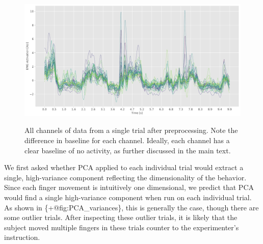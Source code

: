 \begin{figure}
\label{fig:preprocessed_data}
\centering
\includegraphics[width=1\textwidth,height=\textheight]{images/data_analysis/fingers/preprocessed_data.pdf}
\caption{All channels of data from a single trial after preprocessing.
Note the difference in baseline for each channel. Ideally, each channel
has a clear baseline of no activity, as further discussed in the main
text.}\label{fig:preprocessed_data}
\end{figure}

We first asked whether PCA applied to each individual trial would
extract a single, high-variance component reflecting the dimensionality
of the behavior. Since each finger movement is intuitively one
dimensional, we predict that PCA would find a single high-variance
component when run on each individual trial. As shown in
\{+@fig:PCA\_variances\}, this is generally the case, though there are
some outlier trials. After inspecting these outlier trials, it is likely
that the subject moved multiple fingers in these trials counter to the
experimenter's instruction.

